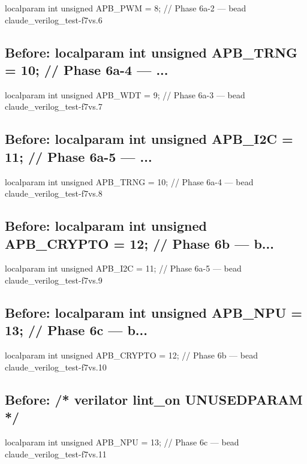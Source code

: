 \begin{record}
\begin{textblock}
localparam int unsigned APB_PWM   = 8;  // Phase 6a-2 — bead claude_verilog_test-f7vs.6
\end{textblock}

\subsection*{Before: localparam int unsigned APB\_TRNG  = 10; // Phase 6a-4 — ...}

\begin{textblock}
localparam int unsigned APB_WDT   = 9;  // Phase 6a-3 — bead claude_verilog_test-f7vs.7
\end{textblock}

\subsection*{Before: localparam int unsigned APB\_I2C   = 11; // Phase 6a-5 — ...}

\begin{textblock}
localparam int unsigned APB_TRNG  = 10; // Phase 6a-4 — bead claude_verilog_test-f7vs.8
\end{textblock}

\subsection*{Before: localparam int unsigned APB\_CRYPTO = 12; // Phase 6b — b...}

\begin{textblock}
localparam int unsigned APB_I2C   = 11; // Phase 6a-5 — bead claude_verilog_test-f7vs.9
\end{textblock}

\subsection*{Before: localparam int unsigned APB\_NPU    = 13; // Phase 6c — b...}

\begin{textblock}
localparam int unsigned APB_CRYPTO = 12; // Phase 6b — bead claude_verilog_test-f7vs.10
\end{textblock}

\subsection*{Before: /* verilator lint\_on  UNUSEDPARAM */}

\begin{textblock}
localparam int unsigned APB_NPU    = 13; // Phase 6c — bead claude_verilog_test-f7vs.11
\end{textblock}

\end{record}

